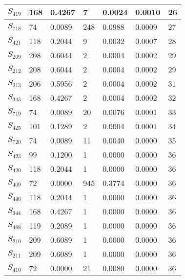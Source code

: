 \begin{xltabular}{\textwidth}{|X|X|X|X|X|X|X|}
 $S_{419}$ & 168 & 0.4267 & 7 & 0.0024 & 0.0010 & 26 \\ \hline
 $S_{718}$ & 74 & 0.0089 & 248 & 0.0988 & 0.0009 & 27 \\ \hline
 $S_{421}$ & 118 & 0.2044 & 9 & 0.0032 & 0.0007 & 28 \\ \hline
 $S_{209}$ & 208 & 0.6044 & 2 & 0.0004 & 0.0002 & 29 \\ \hline
 $S_{212}$ & 208 & 0.6044 & 2 & 0.0004 & 0.0002 & 29 \\ \hline
 $S_{213}$ & 206 & 0.5956 & 2 & 0.0004 & 0.0002 & 31 \\ \hline
 $S_{343}$ & 168 & 0.4267 & 2 & 0.0004 & 0.0002 & 32 \\ \hline
 $S_{719}$ & 74 & 0.0089 & 20 & 0.0076 & 0.0001 & 33 \\ \hline
 $S_{425}$ & 101 & 0.1289 & 2 & 0.0004 & 0.0001 & 34 \\ \hline
 $S_{720}$ & 74 & 0.0089 & 11 & 0.0040 & 0.0000 & 35 \\ \hline
 $S_{423}$ & 99 & 0.1200 & 1 & 0.0000 & 0.0000 & 36 \\ \hline
 $S_{420}$ & 118 & 0.2044 & 1 & 0.0000 & 0.0000 & 36 \\ \hline
 $S_{409}$ & 72 & 0.0000 & 945 & 0.3774 & 0.0000 & 36 \\ \hline
 $S_{446}$ & 118 & 0.2044 & 1 & 0.0000 & 0.0000 & 36 \\ \hline
 $S_{344}$ & 168 & 0.4267 & 1 & 0.0000 & 0.0000 & 36 \\ \hline
 $S_{488}$ & 119 & 0.2089 & 1 & 0.0000 & 0.0000 & 36 \\ \hline
 $S_{210}$ & 209 & 0.6089 & 1 & 0.0000 & 0.0000 & 36 \\ \hline
 $S_{211}$ & 209 & 0.6089 & 1 & 0.0000 & 0.0000 & 36 \\ \hline
 $S_{410}$ & 72 & 0.0000 & 21 & 0.0080 & 0.0000 & 36 \\ \hline
    \end{xltabular}
    